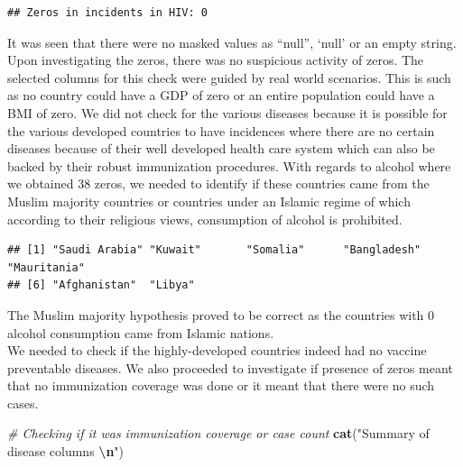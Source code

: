 \documentclass[
  10pt,
]{article}
\newenvironment{Shaded}{\begin{snugshade}}{\end{snugshade}}
\newcommand{\CommentTok}[1]{\textcolor[rgb]{0.56,0.35,0.01}{\textit{#1}}}
\newcommand{\DecValTok}[1]{\textcolor[rgb]{0.00,0.00,0.81}{#1}}
\newcommand{\FunctionTok}[1]{\textcolor[rgb]{0.13,0.29,0.53}{\textbf{#1}}}
\newcommand{\NormalTok}[1]{#1}
\newcommand{\SpecialCharTok}[1]{\textcolor[rgb]{0.81,0.36,0.00}{\textbf{#1}}}
\newcommand{\StringTok}[1]{\textcolor[rgb]{0.31,0.60,0.02}{#1}}
\begin{document}
\begin{verbatim}
## Zeros in incidents in HIV: 0
\end{verbatim}

It was seen that there were no masked values as ``null'', `null' or an
empty string.\\
Upon investigating the zeros, there was no suspicious activity of zeros.
The selected columns for this check were guided by real world scenarios.
This is such as no country could have a GDP of zero or an entire
population could have a BMI of zero. We did not check for the various
diseases because it is possible for the various developed countries to
have incidences where there are no certain diseases because of their
well developed health care system which can also be backed by their
robust immunization procedures. With regards to alcohol where we
obtained 38 zeros, we needed to identify if these countries came from
the Muslim majority countries or countries under an Islamic regime of
which according to their religious views, consumption of alcohol is
prohibited.\\

\begin{Shaded}
\end{Shaded}

\begin{verbatim}
## [1] "Saudi Arabia" "Kuwait"       "Somalia"      "Bangladesh"   "Mauritania"  
## [6] "Afghanistan"  "Libya"
\end{verbatim}

The Muslim majority hypothesis proved to be correct as the countries
with 0 alcohol consumption came from Islamic nations.\\
We needed to check if the highly-developed countries indeed had no
vaccine preventable diseases. We also proceeded to investigate if
presence of zeros meant that no immunization coverage was done or it
meant that there were no such cases.\\

\begin{Shaded}
\begin{Highlighting}[]
\CommentTok{\# Checking if it was immunization coverage or case count}
\FunctionTok{cat}\NormalTok{(}\StringTok{"Summary of disease columns }\SpecialCharTok{\textbackslash{}n}\StringTok{"}\NormalTok{)}
\end{Highlighting}
\end{Shaded}
\end{document}
